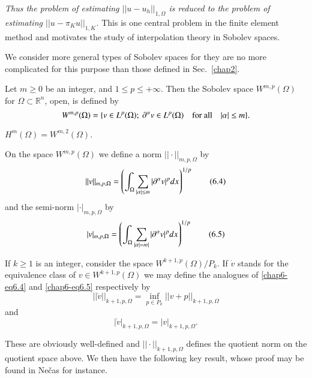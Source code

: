 {\em Thus the problem of estimating $||u-u_{h}||_{1,\Omega}$ is
  reduced to the problem of estimating $||u-\pi_{K}u||_{1,K}$.} This
is one central problem in the finite element method and motivates the
study of interpolation theory in Sobolev spaces.

We consider more general types of Sobolev spaces for they are no more
complicated for this purpose than those defined in Sec.~\ref{chap2}.

\begin{definition}\label{chap6-defi6.1}
Let $m\geq 0$ be an integer, and $1\leq p\leq +\infty$. Then the
Sobolev space $W^{m,p}(\Omega)$ for $\Omega\subset \mathbb{R}^{n}$,
open, is defined by
$$ 
W^{m,p}(\Omega)=\{v\in L^{p}(\Omega);\ \partial^{\alpha}v\in
L^{p}(\Omega)\quad\text{for all}\quad |\alpha|\leq m\}.
$$
\end{definition}

\begin{remark}\label{chap6-rem6.1}
$H^{m}(\Omega)=W^{m,2}(\Omega)$.
\end{remark}

On the space $W^{m,p}(\Omega)$ we define a norm
$||\cdot||_{m,p,\Omega}$ by
\begin{equation*}
||v||_{m,p,\Omega}=\left(\int_{\Omega}\sum_{|\alpha|\leq
  m}|\partial^{\alpha}v|^{p}dx\right)^{1/p}\tag{6.4}\label{chap6-eq6.4} 
\end{equation*}
and the semi-norm $|\cdot|_{m,p,\Omega}$ by
\begin{equation*}
|v|_{m,p,\Omega}=\left(\int_{\Omega}\sum_{|\alpha|=m|}|\partial^{\alpha}v|^{p}dx\right)^{1/p}\tag{6.5}\label{chap6-eq6.5} 
\end{equation*}

If $k\geq 1$ is an integer, consider the space
$W^{k+1,p}(\Omega)/P_{k}$. If $\dot{v}$ stands for the equivalence
class of $v\in W^{k+1,p}(\Omega)$ we may define the analogues of
\eqref{chap6-eq6.4} and \eqref{chap6-eq6.5} respectively by
\begin{equation*}
||\dot{v}||_{k+1,p,\Omega}=\inf\limits_{p\in
  P_{k}}||v+p||_{k+1,p,\Omega}\tag{6.6}\label{chap6-eq6.6} 
\end{equation*}
and\pageoriginale
\begin{equation*}
|\dot{v}|_{k+1,p,\Omega}=|v|_{k+1,p,\Omega}.\tag{6.7}\label{chap6-eq6.7}
\end{equation*}

These are obviously well-defined and $||\cdot||_{k+1,p,\Omega}$
defines the quotient norm on the quotient space above. We then have
the following key result, whose proof may be found in Ne\v{c}as
\cite{key20} for instance.

